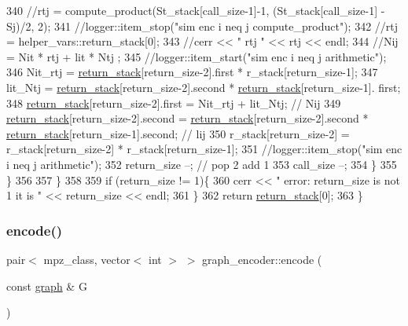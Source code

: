 \begin{DoxyCode}
340         \textcolor{comment}{//rtj = compute\_product(St\_stack[call\_size-1]-1, (St\_stack[call\_size-1] - Sj)/2, 2);}
341         \textcolor{comment}{//logger::item\_stop("sim enc i neq j compute\_product");}
342         \textcolor{comment}{//rtj = helper\_vars::return\_stack[0];}
343         \textcolor{comment}{//cerr << " rtj " << rtj << endl;}
344         \textcolor{comment}{//Nij = Nit * rtj + lit * Ntj ;}
345         \textcolor{comment}{//logger::item\_start("sim enc i neq j arithmetic");}
346         Nit\_rtj = \hyperlink{namespacehelper__vars_a6d2100c373830cacd232319a9958652d}{return\_stack}[return\_size-2].first * r\_stack[return\_size-1];
347         lit\_Ntj = \hyperlink{namespacehelper__vars_a6d2100c373830cacd232319a9958652d}{return\_stack}[return\_size-2].second * \hyperlink{namespacehelper__vars_a6d2100c373830cacd232319a9958652d}{return\_stack}[return\_size-1].
      first;
348         \hyperlink{namespacehelper__vars_a6d2100c373830cacd232319a9958652d}{return\_stack}[return\_size-2].first = Nit\_rtj + lit\_Ntj; \textcolor{comment}{// Nij}
349         \hyperlink{namespacehelper__vars_a6d2100c373830cacd232319a9958652d}{return\_stack}[return\_size-2].second = \hyperlink{namespacehelper__vars_a6d2100c373830cacd232319a9958652d}{return\_stack}[return\_size-2].second * 
      \hyperlink{namespacehelper__vars_a6d2100c373830cacd232319a9958652d}{return\_stack}[return\_size-1].second; \textcolor{comment}{// lij}
350         r\_stack[return\_size-2] = r\_stack[return\_size-2] * r\_stack[return\_size-1];
351         \textcolor{comment}{//logger::item\_stop("sim enc i neq j arithmetic");}
352         return\_size --; \textcolor{comment}{// pop 2 add 1}
353         call\_size --;
354       \}
355     \}
356 
357   \}
358 
359   \textcolor{keywordflow}{if} (return\_size != 1)\{
360     cerr << \textcolor{stringliteral}{" error: return\_size is not 1 it is "} << return\_size << endl;
361   \}
362   \textcolor{keywordflow}{return} \hyperlink{namespacehelper__vars_a6d2100c373830cacd232319a9958652d}{return\_stack}[0];
363 \}
\end{DoxyCode}
\mbox{\label{classgraph__encoder_a23350e4c0986763b24d14c5ef1beb37e}} 
\subsubsection{\texorpdfstring{encode()}{encode()}}
{\footnotesize\ttfamily pair$<$ mpz\+\_\+class, vector$<$ int $>$ $>$ graph\+\_\+encoder\+::encode (\begin{DoxyParamCaption}\item[{const \hyperlink{classgraph}{graph} \&}]{G }\end{DoxyParamCaption})}



